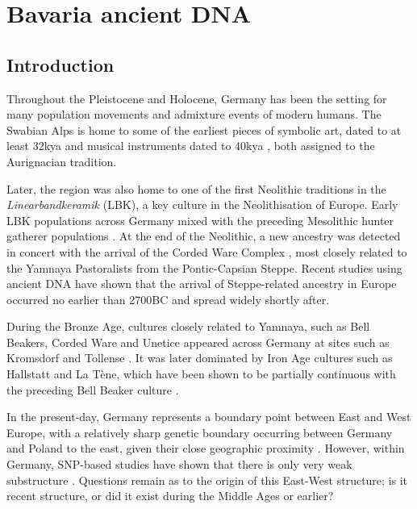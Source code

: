 \chapter{Bavaria ancient DNA}
\label{chapterlabel4}

\section{Introduction}

Throughout the Pleistocene and Holocene, Germany has been the setting for many population movements and admixture events of modern humans. The Swabian Alps is home to some of the earliest pieces of symbolic art, dated to at least 32kya \cite{conard2009female} and musical instruments dated to 40kya \cite{conard2009new}, both assigned to the Aurignacian tradition. 

Later, the region was also home to one of the first Neolithic traditions in the \textit{Linearbandkeramik} (LBK), a key culture in the Neolithisation of Europe. Early LBK populations across Germany mixed with the preceding Mesolithic hunter gatherer populations \cite{Lipson2017b, mathieson2015genome, Haak2015,gunther2015ancient, Hofmanova2016}. At the end of the Neolithic, a new ancestry was detected \cite{Haak2015, Allentoft2015}  in concert with the arrival of the Corded Ware Complex \cite{furholt2003absolutchronologische}, most closely related to the Yamnaya Pastoralists from the Pontic-Capsian Steppe. Recent studies using ancient DNA have shown that the arrival of Steppe-related ancestry in Europe occurred no earlier than 2700BC \cite{furtwangler2020ancient} and spread widely shortly after.

During the Bronze Age, cultures closely related to Yamnaya, such as Bell Beakers, Corded Ware and Unetice \cite{Haak2015} appeared across Germany at sites such as Kromsdorf \cite{lee2012emerging} and Tollense \cite{jantzen2011bronze, brinker2013human}. It was later dominated by Iron Age cultures such as Hallstatt and La Tène, which have been shown to be partially continuous with the preceding Bell Beaker culture \cite{Brunel12791}. 
 
In the present-day, Germany represents a boundary point between East and West Europe, with a relatively sharp genetic boundary occurring between Germany and Poland to the east, given their close geographic proximity \cite{novembre2008genes, kayser2005significant, veeramah2011genetic}. However, within Germany, SNP-based studies have shown that there is only very weak substructure \cite{steffens2006snp}. Questions remain as to the origin of this East-West structure; is it recent structure, or did it exist during the Middle Ages or earlier? 

